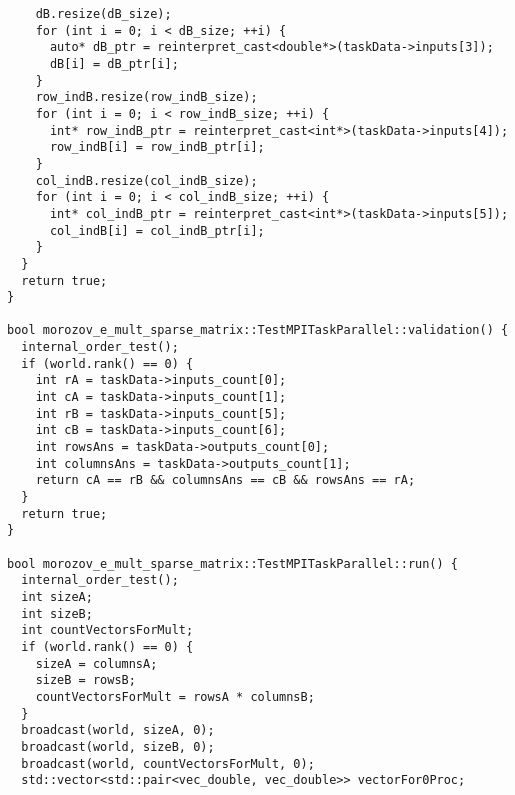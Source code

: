 \documentclass[a4paper,12pt]{article}
\begin{document}
\begin{lstlisting}
    dB.resize(dB_size);
    for (int i = 0; i < dB_size; ++i) {
      auto* dB_ptr = reinterpret_cast<double*>(taskData->inputs[3]);
      dB[i] = dB_ptr[i];
    }
    row_indB.resize(row_indB_size);
    for (int i = 0; i < row_indB_size; ++i) {
      int* row_indB_ptr = reinterpret_cast<int*>(taskData->inputs[4]);
      row_indB[i] = row_indB_ptr[i];
    }
    col_indB.resize(col_indB_size);
    for (int i = 0; i < col_indB_size; ++i) {
      int* col_indB_ptr = reinterpret_cast<int*>(taskData->inputs[5]);
      col_indB[i] = col_indB_ptr[i];
    }
  }
  return true;
}

bool morozov_e_mult_sparse_matrix::TestMPITaskParallel::validation() {
  internal_order_test();
  if (world.rank() == 0) {
    int rA = taskData->inputs_count[0];
    int cA = taskData->inputs_count[1];
    int rB = taskData->inputs_count[5];
    int cB = taskData->inputs_count[6];
    int rowsAns = taskData->outputs_count[0];
    int columnsAns = taskData->outputs_count[1];
    return cA == rB && columnsAns == cB && rowsAns == rA;
  }
  return true;
}

bool morozov_e_mult_sparse_matrix::TestMPITaskParallel::run() {
  internal_order_test();
  int sizeA;
  int sizeB;
  int countVectorsForMult;
  if (world.rank() == 0) {
    sizeA = columnsA;
    sizeB = rowsB;
    countVectorsForMult = rowsA * columnsB;
  }
  broadcast(world, sizeA, 0);
  broadcast(world, sizeB, 0);
  broadcast(world, countVectorsForMult, 0);
  std::vector<std::pair<vec_double, vec_double>> vectorFor0Proc;


\end{lstlisting}
\end{document}
